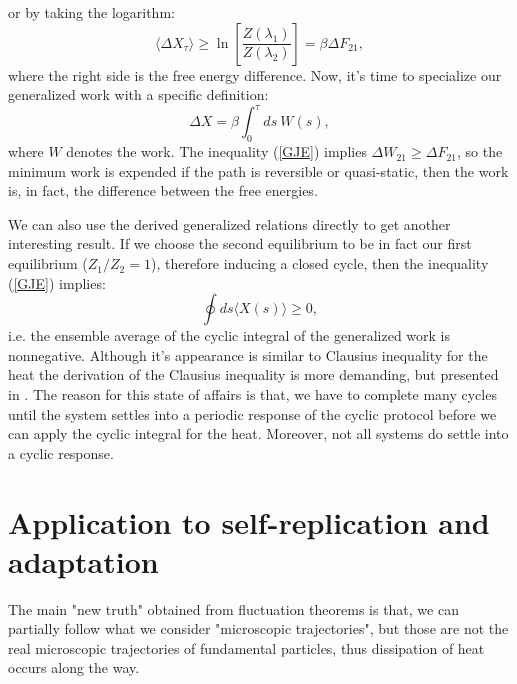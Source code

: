 \documentclass[a4paper,12pt]{article}
\begin{document}
or by taking the logarithm:
\begin{equation}
\label{GJE}
  \langle \Delta X_\tau \rangle \geq \ln\left[\frac{Z(\lambda_1)}{Z(\lambda_2)}\right]=\beta \Delta F_{21},
\end{equation}
where the right side is the free energy difference. Now, it's time to specialize our generalized work with a specific definition:
\begin{equation}
  \Delta X = \beta \int_0^\tau ds\ W(s),
\end{equation}
where $W$ denotes the work. The inequality (\ref{GJE}) implies $\Delta W_{21} \geq \Delta F_{21} $, so the minimum work is expended if the path is reversible or quasi-static, then the work is, in fact, the difference between the free energies.%

We can also use the derived generalized relations directly to get another interesting result. 
If we choose the second equilibrium to be in fact our first equilibrium ($Z_1/Z_2=1$), therefore inducing a closed cycle, then the inequality (\ref{GJE}) implies:
\begin{equation}
\label{CyclicInequalityForGeneralizedWork}
  \oint ds \langle X(s) \rangle \geq 0,
\end{equation}
i.e. the ensemble average of the cyclic integral of the generalized work is nonnegative.
Although it's appearance is similar to Clausius inequality for the heat the derivation of the Clausius inequality is more demanding, but presented in \cite{Evans:2241458}.
The reason for this state of affairs is that, we have to complete many cycles until the system settles into a periodic response of the cyclic protocol before we can apply the cyclic integral for the heat. Moreover, not all systems do settle into a cyclic response.

\section{Application to self-replication and adaptation}
\label{CrooksApplications}

The main "new truth" obtained from fluctuation theorems is that, we can partially follow what we consider "microscopic trajectories", but those are not the real microscopic trajectories of fundamental particles, thus dissipation of heat occurs along the way.
\end{document}
